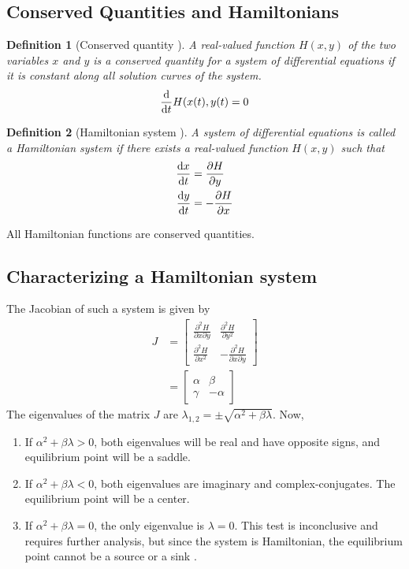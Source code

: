 \documentclass[11pt,1in]{article}
\newtheorem{definition}{Definition}
\begin{document}
\subsection{Conserved Quantities and Hamiltonians}
\begin{definition}[Conserved quantity \cite{diff_eq}]
A real-valued function $H(x,y)$ of the two variables $x$ and $y$ is a conserved quantity for a system of differential equations if it is constant along all solution curves of the system. 
\begin{align}
\derivative{}{t}H(x(t), y(t) = 0
\end{align}
\end{definition}
\newpage
\begin{definition}[Hamiltonian system \cite{diff_eq}]
A system of differential equations is called a \textit{Hamiltonian system} if there exists a real-valued function $H(x,y)$ such that 
\begin{align}
\derivative{x}{t} &= \frac{\partial H}{\partial y} \label{ham_1} \\
\derivative{y}{t} &= - \frac{\partial H}{\partial x} \label{ham_2}
\end{align}
\end{definition}
All Hamiltonian functions are conserved quantities.
\subsection{Characterizing a Hamiltonian system}
The Jacobian of such a system is given by 
\begin{align}
J &= \begin{bmatrix}
\frac{\partial^2H}{\partial x \partial y} & \frac{\partial^2H}{\partial y^2} \\
\frac{\partial^2H}{\partial x^2} & -\frac{\partial^2H}{\partial x \partial y}
\end{bmatrix} \\
&= \begin{bmatrix}
\alpha & \beta \\
\gamma & -\alpha
\end{bmatrix}
\end{align}
The eigenvalues of the matrix $J$ are $\lambda_{1,2} = \pm \sqrt{\alpha^2 + \beta\lambda}$. Now,
\begin{enumerate}
	\item If $\alpha^2 + \beta\lambda > 0$, both eigenvalues will be real and have opposite signs, and equilibrium point will be a saddle. 
	\item If $\alpha^2 + \beta\lambda < 0$, both eigenvalues are imaginary and complex-conjugates. The equilibrium  point will be a center. 
	\item If $\alpha^2 + \beta\lambda = 0$, the only eigenvalue is $\lambda = 0$. This test is inconclusive and requires further analysis, but since the system is Hamiltonian, the equilibrium point cannot be a source or a sink \cite{diff_eq}.  
\end{enumerate}
\end{document}
